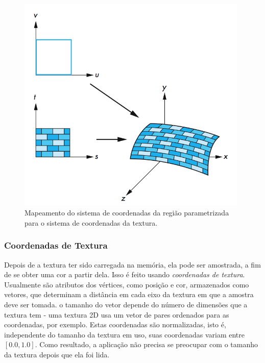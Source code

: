 \documentclass[12pt, a4paper, oneside]{book}
\begin{document}
\begin{figure}[!htb]
\center
\includegraphics[width=11cm]{tex_mapping}
\caption{Mapeamento do sistema de coordenadas da região parametrizada para o sistema de coordenadas da textura.}
\label{tex_map}
\end{figure}

\subsubsection{Coordenadas de Textura}

Depois de a textura ter sido carregada na memória, ela pode ser amostrada, a fim de se obter uma cor a partir dela. Isso é feito usando \emph{coordenadas de textura}. Usualmente são atributos dos vértices, como posição e cor, armazenados como vetores, que determinam a distância em cada eixo da textura em que a amostra deve ser tomada. o tamanho do vetor depende do número de dimensões que a textura tem - uma textura 2D usa um vetor de pares ordenados para as coordenadas, por exemplo. Estas coordenadas são normalizadas, isto é, independente do tamanho da textura em uso, suas coordenadas variam entre $[0.0, 1.0]$. Como resultado, a aplicação não precisa se preocupar com o tamanho da textura depois que ela foi lida. 
\end{document}
